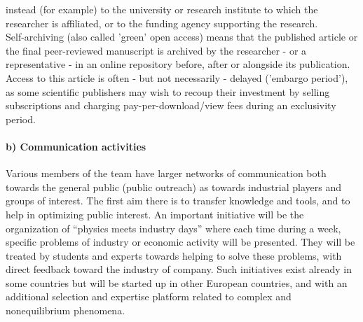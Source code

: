 {\begin{compactitem}
    instead (for example) to the university or research institute to which the
    researcher is affiliated, or to the funding agency supporting the research.\\
%
    Self-archiving (also called 'green' open access) means that the published
    article or the final peer-reviewed manuscript is archived by the researcher
    - or a representative - in an online repository before, after or alongside
    its publication.  Access to this article is often - but not necessarily -
    delayed ('embargo period'), as some scientific publishers may wish to recoup
    their investment by selling subscriptions and charging pay-per-download/view
    fees during an exclusivity period.
%
  \end{compactitem}
}

\paragraph{b) Communication activities}


Various members of the team have larger networks of communication both towards the general
public (public outreach) as towards industrial players and groups of interest.  The first
aim there is to transfer knowledge and tools, and to help in optimizing public interest. An
important initiative will be the organization of ``physics meets industry days'' where each
time during a week, specific problems of industry or economic activity will be presented.
They will be treated by students and experts towards helping to solve these problems, with
direct feedback toward the industry of company.  Such initiatives exist already in some
countries but will be started up in other European countries, and with an additional
selection and expertise platform related to complex and nonequilibrium phenomena.



